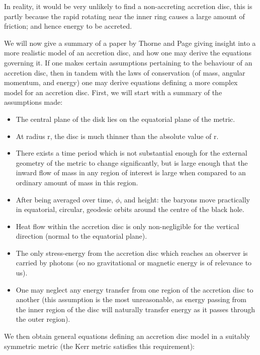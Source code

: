 \documentclass[oneside,openright,frontopenright, singlespacing]{dmathesis}
\begin{document}
\vspace{1em}
	In reality, it would be very unlikely to find a non-accreting accretion disc, this is partly because the rapid rotating near the inner ring causes a large amount of friction; and hence energy to be accreted.

\vspace{1em}
	We will now give a summary of a paper by Thorne and Page\cite{page1974disk} giving insight into a more realistic model of an accretion disc, and how one may derive the equations governing it. If one makes certain assumptions pertaining to the behaviour of an accretion disc, then in tandem with the laws of conservation (of mass, angular momentum, and energy) one may derive equations defining a more complex model for an accretion disc. First, we will start with a summary of the assumptions made:

\vspace{1em}
\begin{itemize}
	\item The central plane of the disk lies on the equatorial plane of the metric.
	\item At radius r, the disc is much thinner than the absolute value of r.
	\item There exists a time period which is not substantial enough for the external geometry of the metric to change significantly, but is large enough that the inward flow of mass in any region of interest is large when compared to an ordinary amount of mass in this region.
	\item After being averaged over time, $\phi$, and height: the baryons move practically in equatorial, circular, geodesic orbits around the centre of the black hole.
	\item Heat flow within the accretion disc is only non-negligible for the vertical direction (normal to the equatorial plane).
	\item The only stress-energy from the accretion disc which reaches an observer is carried by photons (so no gravitational or magnetic energy is of relevance to us).
	\item One may neglect any energy transfer from one region of the accretion disc to another (this assumption is the most unreasonable, as energy passing from the inner region of the disc will naturally transfer energy as it passes through the outer region).
\end{itemize}

\vspace{1em}
	We then obtain general equations defining an accretion disc model in a suitably symmetric metric (the Kerr metric satisfies this requirement):
\end{document}
